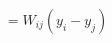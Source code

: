 \documentclass[preview]{standalone}
\begin{document}
\begin{align*}
= W_{ij}(y_i - y_j)
\end{align*}
\end{document}
